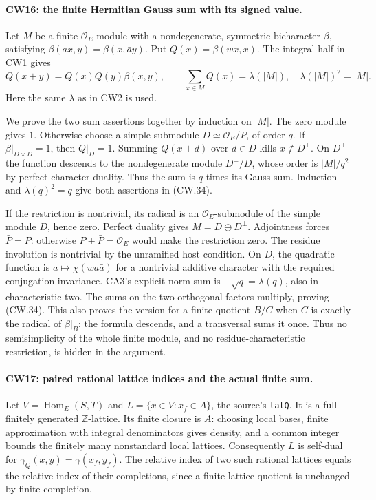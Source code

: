 \paragraph{CW16: the finite Hermitian Gauss sum with its signed value.}
Let $M$ be a finite $\mathcal O_E$-module with a nondegenerate,
symmetric bicharacter $\beta$, satisfying
$\beta(ax,y)=\beta(x,\bar a y)$.  Put
$Q(x)=\beta(wx,x)$.  The integral half in CW1 gives
\[
 Q(x+y)=Q(x)Q(y)\beta(x,y),\qquad
       \sum_{x\in M}Q(x)=\lambda(|M|),\quad
                        \lambda(|M|)^2=|M|.           \tag{CW.34}
\]
Here the same $\lambda$ as in CW2 is used.

We prove the two sum assertions together by induction on $|M|$.
The zero module gives $1$.  Otherwise choose a simple submodule
$D\simeq\mathcal O_E/P$, of order $q$.
If $\beta|_{D\times D}=1$, then $Q|_D=1$.
Summing $Q(x+d)$ over $d\in D$ kills $x\notin D^\perp$.
On $D^\perp$ the function descends to the nondegenerate module
$D^\perp/D$, whose order is $|M|/q^2$ by perfect character duality.
Thus the sum is $q$ times its Gauss sum.  Induction and
$\lambda(q)^2=q$ give both assertions in (CW.34).

If the restriction is nontrivial, its radical is an
$\mathcal O_E$-submodule of the simple module $D$, hence zero.
Perfect duality gives $M=D\oplus D^\perp$.  Adjointness forces
$\bar P=P$: otherwise $P+\bar P=\mathcal O_E$ would make the
restriction zero.  The residue involution is nontrivial by the
unramified host condition.  On $D$, the quadratic function is
$a\mapsto\chi(w a\bar a)$ for a nontrivial additive character
with the required conjugation invariance.  CA3's explicit norm
sum is $-\sqrt q=\lambda(q)$, also in characteristic two.
The sums on the two orthogonal factors multiply, proving (CW.34).
This also proves the version for a finite quotient $B/C$ when
$C$ is exactly the radical of $\beta|_B$: the formula descends,
and a transversal sums it once.  Thus no semisimplicity of the
whole finite module, and no residue-characteristic restriction,
is hidden in the argument.

\paragraph{CW17: paired rational lattice indices and the actual finite sum.}
Let $V=\operatorname{Hom}_E(S,T)$ and
$L=\{x\in V:x_f\in A\}$, the source's \texttt{latQ}.
It is a full finitely generated $\mathbb Z$-lattice.  Its finite
closure is $A$: choosing local bases, finite approximation with
integral denominators gives density, and a common integer bounds
the finitely many nonstandard local lattices.  Consequently
$L$ is self-dual for
$\gamma_Q(x,y)=\gamma(x_f,y_f)$.  The relative index of two such
rational lattices equals the relative index of their completions,
since a finite lattice quotient is unchanged by finite completion.

